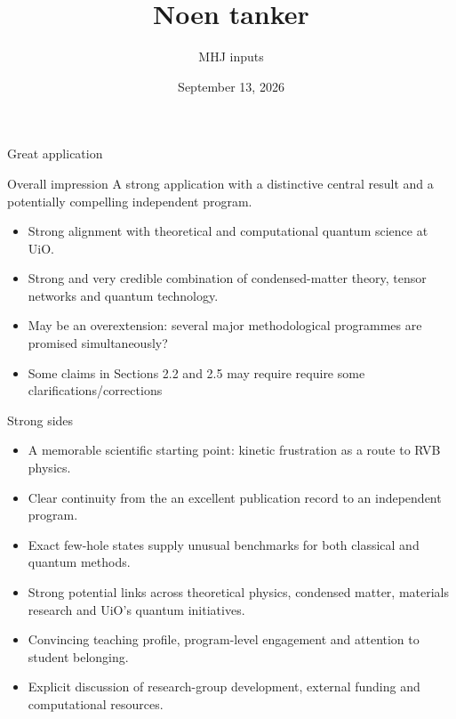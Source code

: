 \documentclass[aspectratio=169,11pt]{beamer}
\title{Noen tanker}
\author{MHJ inputs}
\institute{UiO}
\date{September 13, 2026}
\begin{document}
\begin{frame}[plain]
  \titlepage
\end{frame}

\begin{frame}{Great application}
\begin{block}{Overall impression}
A strong application with a distinctive central result and a potentially compelling independent program. 
\end{block}
\begin{itemize}
  \item Strong alignment with theoretical and computational quantum science at UiO.
  \item Strong and very credible  combination of condensed-matter theory, tensor networks and quantum technology.
  \item May be  an \alert{overextension}: several major methodological programmes are promised simultaneously?
  \item Some claims in Sections 2.2 and 2.5 may require require some clarifications/corrections
\end{itemize}
\end{frame}

\begin{frame}{Strong sides}
\begin{itemize}
  \item A memorable scientific starting point: kinetic frustration as a route to RVB physics.
  \item Clear continuity from the an excellent  publication record to an independent program.
  \item Exact few-hole states supply unusual benchmarks for both classical and quantum methods.
  \item Strong potential links across theoretical physics, condensed matter, materials research and UiO's quantum initiatives.
  \item Convincing teaching profile, program-level engagement and attention to student belonging.
  \item Explicit discussion of research-group development, external funding and computational resources.
\end{itemize}
\end{frame}
\end{document}
